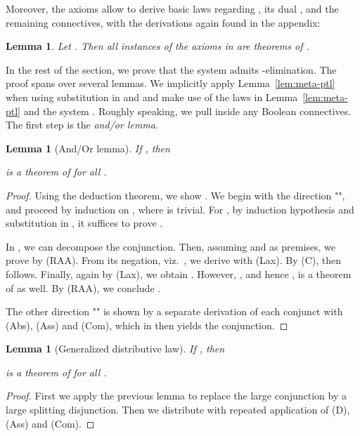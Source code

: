 \documentclass[a4paper,english,fleqn,11pt,final]{scrartcl}
\newcommand{\Deriv}[1]{{\normalfont\textsf{#1}}}
\theoremstyle{plain}
\newtheorem{lemma}[theorem]{Lemma}
\theoremstyle{definition}
\begin{document}
Moreover, the axioms  allow to derive basic laws regarding , its dual , and the remaining connectives, with the derivations again found in the appendix:


\begin{lemma}\label{lem:ptl-laws}
Let . Then all instances of the axioms in  are theorems of .
\end{lemma}






In the rest of the section, we prove that the system admits -elimination.
The proof spans over several lemmas.
We implicitly apply Lemma~\ref{lem:meta-ptl} when using substitution in  and  and make use of the laws in Lemma~\ref{lem:meta-ptl} and the system .
Roughly speaking, we pull  inside any Boolean connectives.
The first step is the \emph{and/or lemma}.

\begin{lemma}[And/Or lemma]\label{lem:vee-swap}
If , then

is a theorem of  for all .
\end{lemma}
\begin{proof}
Using the deduction theorem, we show .
We begin with the direction "", and proceed by induction on , where  is trivial.
For , by induction hypothesis and substitution in , it suffices to prove .

In , we can decompose the conjunction.
Then, assuming  and  as premises, we prove  by \Deriv{(RAA)}.
From its negation, viz.\ ,
we derive  with \Deriv{(Lax)}.
By \Deriv{(C)}, then  follows.
Finally, again by \Deriv{(Lax)}, we obtain .
However, , and hence , is a theorem of  as well.
By \Deriv{(RAA)}, we conclude .

The other direction "" is shown by a separate derivation of each conjunct with \Deriv{(Abs)}, \Deriv{(Ass)} and \Deriv{(Com)}, which in  then yields the conjunction.
\end{proof}

\begin{lemma}[Generalized distributive law]\label{lem:distribute-alpha}
If , then

is a theorem of  for all .
\end{lemma}
\begin{proof}
First we apply the previous lemma to replace the large conjunction by a large splitting disjunction.
Then we distribute  with repeated application of \Deriv{(D)}, \Deriv{(Ass)} and \Deriv{(Com)}.
\end{proof}
\end{document}
